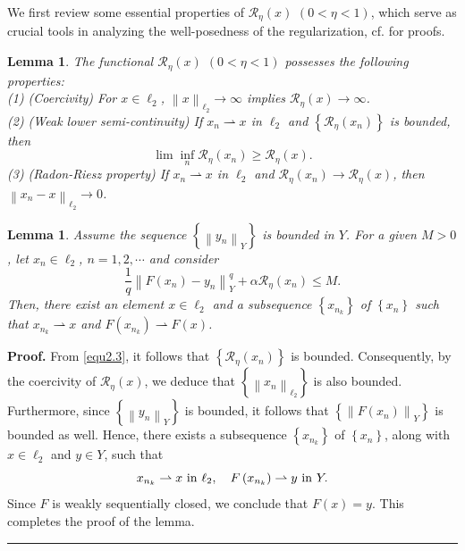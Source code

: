 \documentclass[a4paper,12pt]{article}
\newtheorem{lemma}[theorem]{Lemma}
\numberwithin{equation}{section}
\newenvironment{proof}[1][Proof]{\textbf{#1.} }
{\ \rule{0.75em}{0.75em}\smallskip}
\begin{document}
\par We first review some essential properties of $\mathcal{R}_{\eta}\left(x\right)$ $\left(0<\eta <1\right)$, which serve as crucial tools in analyzing the well-posedness of the regularization, cf. \cite{LD25} for proofs.

\begin{lemma}\label{lem2.4}
    The functional $\mathcal{R}_{\eta}\left(x\right)$ $\left(0<\eta <1\right)$ possesses the following properties:\\
    (1) (Coercivity) For $x\in\ell_{2}$, $\left\|x\right\|_{\ell_{2}}\rightarrow \infty$ implies $\mathcal{R}_{\eta}\left(x\right)\rightarrow\infty$.\\
    (2) (Weak lower semi-continuity) If $x_{n}\rightharpoonup x$ in $\ell_{2}$ and $\left\{\mathcal{R}_{\eta}\left(x_{n}\right)\right\}$ is bounded, then 
    \begin{equation*}
        \lim\inf_{n}\mathcal{R}_{\eta}\left(x_{n}\right)\geq\mathcal{R}_{\eta}\left(x\right).
    \end{equation*}
    (3) (Radon-Riesz property) If $x_{n}\rightharpoonup x$ in $\ell_{2}$ and $\mathcal{R}_{\eta}\left(x_{n}\right)\rightarrow\mathcal{R}_{\eta}\left(x\right)$, then $\left\|x_{n}-x\right\|_{\ell_{2}}\rightarrow 0$.
\end{lemma}

\begin{lemma}
    Assume the sequence $\left\{\left\|y_{n}\right\|_{Y}\right\}$ is bounded in $Y$. For a given $M>0$, let $x_{n}\in\ell_{2}$, $n=1,2,\cdots$ and consider
    \begin{equation}\label{equ2.3}
        \frac{1}{q}\left\|F\left(x_{n}\right)-y_{n}\right\|_{Y}^{q}+\alpha\mathcal{R}_{\eta} \left(x_{n}\right)\leq M.
    \end{equation}
    Then, there exist an element $x\in\ell_{2}$ and a subsequence $\left\{x_{n_{k}}\right\}$ of $\left\{x_{n}\right\}$ such that $x_{n_{k}}\rightharpoonup x$ and $F\left(x_{n_{k}}\right)\rightharpoonup F\left(x\right)$.
\end{lemma}

\begin{proof}
    From \eqref{equ2.3}, it follows that $\left\{\mathcal{R}_{\eta}\left(x_{n}\right)\right\}$ is bounded. Consequently, by the coercivity of $\mathcal{R}_{\eta}\left(x\right)$, we deduce that $\left\{\left\|x_{n}\right\|_{\ell_{2}}\right\}$ is also bounded. Furthermore, since $\left\{\left\|y_{n}\right\|_{Y}\right\}$ is bounded, it follows that $\left\{\left\|F\left(x_{n}\right)\right\|_{Y}\right\}$ is bounded as well. Hence, there exists a subsequence $\left\{x_{n_{k}}\right\}$ of $\left\{x_{n}\right\}$, along with $x\in\ell_{2}$ and $y\in Y$, such that
    \begin{equation*}
        x_{n_{k}}\rightharpoonup x\ {\rm in}\ \ell_{2}, \quad F\left(x_{n_{k}}\right)\rightharpoonup y\ {\rm in}\ Y.
    \end{equation*}
    Since $F$ is weakly sequentially closed, we conclude that $F\left(x\right)=y$. This completes the proof of the lemma.
\end{proof}
\end{document}
